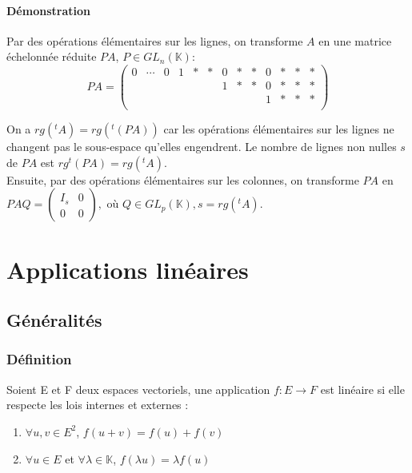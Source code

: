 \documentclass[a4paper,10pt]{book} %
\newcommand{\K}{\mathbb{K}}
\begin{document}
\subsubsection{Démonstration}

Par des opérations élémentaires sur les lignes, on transforme $A$ en une matrice échelonnée réduite $PA$, $P\in GL_n(\K):$\\
$$PA=\begin{pmatrix}
0&\cdots& 0 & 1 &*&*& 0&*&*& 0&*&*&*\\
 &      &   &   & & & 1&*&*& 0&*&*&*\\
 &      &   &   & & &  & & & 1&*&*&*\\
 &      &   &   & & &  & & &  & & &
\end{pmatrix}$$

On a $rg(^tA)=rg ({}^t(PA))$ car les opérations élémentaires sur les lignes ne changent pas le sous-espace qu'elles engendrent. Le nombre de lignes non nulles $s$ de $PA$ est $rg {}^t(PA)=rg(^tA)$.\\
Ensuite, par des opérations élémentaires sur les colonnes, on transforme $PA$ en\\
$PAQ=\begin{pmatrix}
I_s& 0\\
0& 0
\end{pmatrix}, \text{ où } Q\in GL_p(\K), s=rg(^tA)$.







\chapter{Applications linéaires}
\section{Généralités}
\subsection{Définition}
Soient E et F deux espaces vectoriels, une application $f:E\rightarrow F$ est linéaire si elle respecte les lois internes et externes : \begin{enumerate}
\item $\forall u,v\in E^2$, $f(u+v)=f(u)+f(v)$
\item $\forall u\in E$ et $\forall\lambda\in \K$, $f(\lambda u)=\lambda f(u)$
\end{enumerate}
\end{document}
